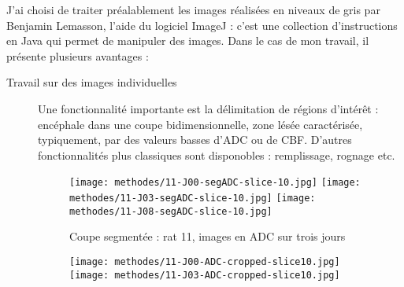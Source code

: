J'ai choisi de traiter pr\'ealablement les images r\'ealis\'ees en niveaux de gris par Benjamin Lemasson,  l'aide du logiciel ImageJ : %
c'est une collection d'instructions en Java qui permet de manipuler des images. Dans le cas de mon travail, il pr\'esente plusieurs avantages :
%
\begin{description}
\item[Travail sur des images individuelles] Une fonctionnalit\'e importante est la d\'elimitation de r\'egions d'int\'er\^et : %
enc\'ephale dans une coupe bidimensionnelle, zone l\'es\'ee caract\'eris\'ee, typiquement, par des valeurs basses d'ADC ou de CBF. %
D'autres fonctionnalit\'es plus classiques sont disponobles : remplissage, rognage etc.
%
\begin{comment}
\begin{tabular}{ccc}%
\texttt{[image: methodes/11-J00-segADC-slice-10.jpg]}%
&
\texttt{[image: methodes/11-J03-segADC-slice-10.jpg]}%
&
\texttt{[image: methodes/11-J08-segADC-slice-10.jpg]}%
\\
\texttt{[image: methodes/11-J00-ADC-cropped-slice10.jpg]}%
&
\texttt{[image: methodes/11-J03-ADC-cropped-slice10.jpg]}%
&
\texttt{[image: methodes/11-J08-ADC-cropped-slice10.jpg]}%
\\
\end{tabular}
\end{comment}
%
\begin{figure}[H]
\begin{center}
\texttt{[image: methodes/11-J00-segADC-slice-10.jpg]}%
\hfill
\texttt{[image: methodes/11-J03-segADC-slice-10.jpg]}%
\hfill
\texttt{[image: methodes/11-J08-segADC-slice-10.jpg]}%
\end{center}
\caption{Coupe segment\'ee : rat 11, images en ADC sur trois jours}
\label{ex_cer}
\end{figure}
%
\begin{figure}[H]
\begin{center}
\texttt{[image: methodes/11-J00-ADC-cropped-slice10.jpg]}%
\hfill
\texttt{[image: methodes/11-J03-ADC-cropped-slice10.jpg]}%

\end{center}
\end{figure}
\end{description}
